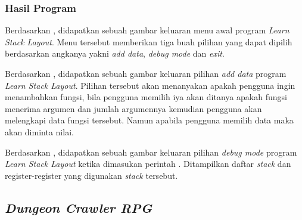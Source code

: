 \documentclass[../main.tex]{subfiles}
\begin{document}
    \subsubsection{Hasil Program}
    \begin{indentlevel0}
        \ilz{}Berdasarkan , didapatkan sebuah gambar keluaran menu awal program \textit{Learn Stack Layout}. Menu tersebut memberikan tiga buah pilihan yang dapat dipilih berdasarkan angkanya yakni \textit{add data}, \textit{debug mode} dan \textit{exit}.
    \end{indentlevel0}

    \begin{indentlevel0}
        \ilz{}Berdasarkan , didapatkan sebuah gambar keluaran pilihan \textit{add data} program \textit{Learn Stack Layout}. Pilihan tersebut akan menanyakan apakah pengguna ingin menambahkan fungsi, bila pengguna memilih iya akan ditanya apakah fungsi menerima argumen dan jumlah argumennya kemudian pengguna akan melengkapi data fungsi tersebut. Namun apabila pengguna memilih data maka akan diminta nilai.
    \end{indentlevel0}

    \begin{indentlevel0}
        \ilz{}Berdasarkan , didapatkan sebuah gambar keluaran pilihan \textit{debug mode} program \textit{Learn Stack Layout} ketika dimasukan perintah . Ditampilkan daftar \textit{stack} dan register-register yang digunakan \textit{stack} tersebut.
    \end{indentlevel0}
    
    \subsection{\textit{Dungeon Crawler RPG}}
\end{document}
